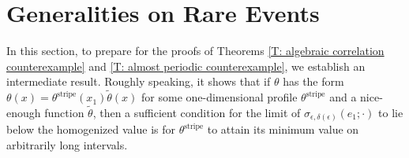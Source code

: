 \documentclass[12pt]{amsart}
\newtheorem{remark}{Remark}
\begin{document}
%
%	
	
\section{Generalities on Rare Events}

In this section, to prepare for the proofs of Theorems \ref{T: algebraic correlation counterexample} and \ref{T: almost periodic counterexample}, we establish an intermediate result.  Roughly speaking, it shows that if $\theta$ has the form $\theta(x) = \theta^{\text{stripe}}(x_{1}) \tilde{\theta}(x)$ for some one-dimensional profile $\theta^{\text{stripe}}$ and a nice-enough function $\tilde{\theta}$, then a sufficient condition for the limit of $\sigma_{\epsilon,\delta(\epsilon)} ( e_1 ; \cdot ) $ to lie below the homogenized value is for $\theta^{\text{stripe}}$ to attain its minimum value on arbitrarily long intervals. 
\end{document}

